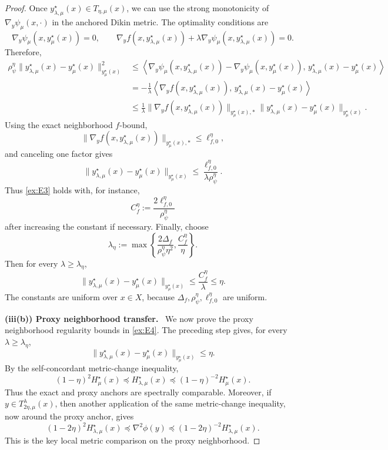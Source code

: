 \documentclass{article}
\newcommand{\proofstep}[1]{\par\smallskip\noindent\textbf{#1}\ }
\begin{document}
\begin{proof}
Once \(y_{\lambda,\mu}^\star(x)\in T_{\eta,\mu}(x)\), we can use the strong monotonicity of
\(\nabla_y\psi_\mu(x,\cdot)\) in the anchored Dikin metric. The optimality conditions are
\[
\nabla_y\psi_\mu(x,y_\mu^\star(x))=0,
\qquad
\nabla_y f(x,y_{\lambda,\mu}^\star(x))
+
\lambda\nabla_y\psi_\mu(x,y_{\lambda,\mu}^\star(x))
=
0.
\]
Therefore,
\begin{align*}
\rho_\psi^\eta
\|y_{\lambda,\mu}^\star(x)-y_\mu^\star(x)\|_{y_\mu^\star(x)}^2
&\le
\left\langle
\nabla_y\psi_\mu(x,y_{\lambda,\mu}^\star(x))
-
\nabla_y\psi_\mu(x,y_\mu^\star(x)),
\,y_{\lambda,\mu}^\star(x)-y_\mu^\star(x)
\right\rangle \\
&=
-\frac{1}{\lambda}
\left\langle
\nabla_y f(x,y_{\lambda,\mu}^\star(x)),
\,y_{\lambda,\mu}^\star(x)-y_\mu^\star(x)
\right\rangle \\
&\le
\frac{1}{\lambda}
\|\nabla_y f(x,y_{\lambda,\mu}^\star(x))\|_{y_\mu^\star(x),*}
\|y_{\lambda,\mu}^\star(x)-y_\mu^\star(x)\|_{y_\mu^\star(x)}.
\end{align*}
Using the exact neighborhood \(f\)-bound,
\[
\|\nabla_y f(x,y_{\lambda,\mu}^\star(x))\|_{y_\mu^\star(x),*}
\le
\ell_{f,0}^\eta,
\]
and canceling one factor gives
\[
\|y_{\lambda,\mu}^\star(x)-y_\mu^\star(x)\|_{y_\mu^\star(x)}
\le
\frac{\ell_{f,0}^\eta}{\lambda\rho_\psi^\eta}.
\]
Thus \eqref{ex:E3} holds with, for instance,
\[
C_f^\eta:=\frac{2\ell_{f,0}^\eta}{\rho_\psi^\eta}
\]
after increasing the constant if necessary. Finally, choose
\[
\lambda_\eta
:=
\max\left\{
\frac{2\Delta_f}{\rho_\psi^\eta\eta^2},
\frac{C_f^\eta}{\eta}
\right\}.
\]
Then for every \(\lambda\ge\lambda_\eta\),
\[
\|y_{\lambda,\mu}^\star(x)-y_\mu^\star(x)\|_{y_\mu^\star(x)}
\le
\frac{C_f^\eta}{\lambda}
\le
\eta .
\]
The constants are uniform over \(x\in X\), because
\(\Delta_f,\rho_\psi^\eta,\ell_{f,0}^\eta\) are uniform.

\proofstep{(iii(b)) Proxy neighborhood transfer.}
We now prove the proxy neighborhood regularity bounds in \eqref{ex:E4}. The preceding step gives, for every
\(\lambda\ge\lambda_\eta\),
\[
\|y_{\lambda,\mu}^\star(x)-y_\mu^\star(x)\|_{y_\mu^\star(x)}
\le
\eta .
\]
By the self-concordant metric-change inequality,
\begin{equation}
\label{eq:proxy_exact_anchor_comparison}
(1-\eta)^2H_\mu^\star(x)
\preceq
H_{\lambda,\mu}^\star(x)
\preceq
(1-\eta)^{-2}H_\mu^\star(x).
\end{equation}
Thus the exact and proxy anchors are spectrally comparable. Moreover, if
\(y\in T_{2\eta,\mu}^{\lambda}(x)\), then another application of the same metric-change inequality,
now around the proxy anchor, gives
\begin{equation}
\label{eq:proxy_tube_barrier_metric_change}
(1-2\eta)^2H_{\lambda,\mu}^\star(x)
\preceq
\nabla^2\phi(y)
\preceq
(1-2\eta)^{-2}H_{\lambda,\mu}^\star(x).
\end{equation}
This is the key local metric comparison on the proxy neighborhood.


\end{proof}
\end{document}
